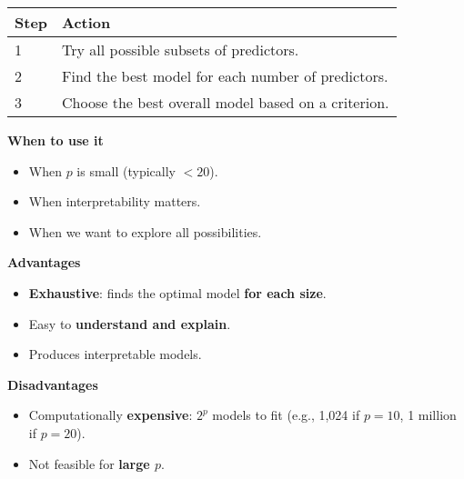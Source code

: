 \begin{table}[!htp]
    \centering
    \begin{tabular}{@{} l l @{}}
        \toprule
        Step & Action \\
        \midrule
        1 & Try all possible subsets of predictors. \\ [.3em]
        2 & Find the best model for each number of predictors. \\ [.3em]
        3 & Choose the best overall model based on a criterion. \\
        \bottomrule
    \end{tabular}
\end{table}

\highspace
\begin{flushleft}
    \textcolor{Green3}{ \textbf{When to use it}}
\end{flushleft}
\begin{itemize}
    \item When $p$ is small (typically $< 20$).
    \item When interpretability matters.
    \item When we want to explore all possibilities.
\end{itemize}

\newpage

\begin{flushleft}
    \textcolor{Green3}{ \textbf{Advantages}}
\end{flushleft}
\begin{itemize}[label=\textcolor{Green3}{}]
    \item \textbf{Exhaustive}: finds the optimal model \textbf{for each size}.
    \item Easy to \textbf{understand and explain}.
    \item Produces interpretable models.
\end{itemize}

\highspace
\begin{flushleft}
    \textcolor{Red2}{ \textbf{Disadvantages}}
\end{flushleft}
\begin{itemize}[label=\textcolor{Red2}{}]
    \item Computationally \textbf{expensive}: $2^p$ models to fit (e.g., 1,024 if $p = 10$, 1 million if $p = 20$).
    \item Not feasible for \textbf{large $p$}.
\end{itemize}

